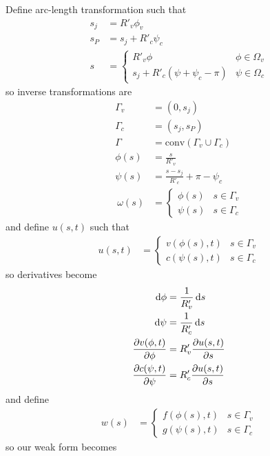 \documentclass{report}
\newcommand\Par[1]{{ \left({#1}\right) }}
\newcommand\Rc{{ R'_c }}
\newcommand\Rv{{ R'_v }}
\newcommand\conv{{ \text{conv} }}
\begin{document}
Define arc-length transformation such that
\begin{align*}
	s_j &= \Rv \phi_v \\
	s_P &= s_j + \Rc \psi_c \\
	s &= \begin{cases}
		\Rv \phi & \phi \in \Omega_v \\
		s_j + \Rc \Par{\psi + \psi_c - \pi} & \psi \in \Omega_c
	\end{cases}
\end{align*}
so inverse transformations are
\begin{align*}
	\Gamma_v &= (0, s_j) \\
	\Gamma_c &= (s_j, s_P) \\
	\Gamma &= \conv\Par{\Gamma_v \cup \Gamma_c} \\
	\phi(s) &= \frac{s}{\Rv} \\
	\psi(s) &= \frac{s - s_j}{\Rc} + \pi - \psi_c \\\
	\omega(s) &= \begin{cases}
		\phi(s) & s \in \Gamma_v \\
		\psi(s) & s \in \Gamma_c
	\end{cases}
\end{align*}
and define $u(s, t)$ such that
\begin{align*}
	u(s, t) &= \begin{cases}
		v(\phi(s), t) & s \in \Gamma_v \\
		c(\psi(s), t) & s \in \Gamma_c
	\end{cases}
\end{align*}
so derivatives become
\begin{align*}
	\dd\phi &= \frac{1}{\Rv} \dd{s} \\
	\dd\psi &= \frac{1}{\Rc} \dd{s} \\
	\pdv{v(\phi, t)}{\phi} &= \Rv \pdv{u(s, t)}{s} \\
	\pdv{c(\psi, t)}{\psi} &= \Rc \pdv{u(s, t)}{s}
\end{align*}
and define
\begin{align*}
	w(s) &= \begin{cases}
		f(\phi(s), t) & s \in \Gamma_v \\
		g(\psi(s), t) & s \in \Gamma_c
	\end{cases}
\end{align*}
so our weak form becomes
\end{document}

